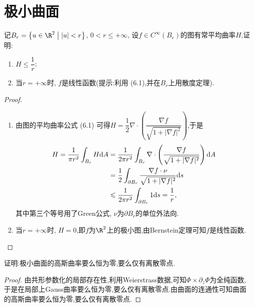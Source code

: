 \section{极小曲面}
\begin{excise}
		记$B_{r}=\left\{u\in\R^{2}\bigm||u|<r\right\}$, $0<r\leqslant +\infty$,
		设$f\in C^{\infty}(B_{r})$的图有常平均曲率$H$,证明:
		\begin{enumerate}[label=(\arabic*)]
			\item $H\leqslant\dfrac{1}{r}$;
			\item 当$r=+\infty$时, $f$是线性函数(提示:利用 (6.1),并在$B_{r}$上用散度定理).
		\end{enumerate}
	\end{excise}
	\begin{proof}
		\begin{enumerate}[label=(\arabic*)]
			\item 由图的平均曲率公式 (6.1) 可得$H=\dfrac{1}{2}\nabla\cdot\left(\dfrac{\nabla f}{\sqrt{1+|\nabla f|^{2}}}\right)$,于是
			\begin{align*}
				H=\frac{1}{\pi r^{2}}\int_{B_{r}}H\mathrm{d} A&=\frac{1}{2\pi r^{2}}\int_{B_{r}}\nabla\cdot\left(\dfrac{\nabla f}{\sqrt{1+|\nabla f|^{2}}}\right)\mathrm{d} A\\
				&=\frac{1}{2}\int_{\partial B_{r}}\dfrac{\nabla f\cdot\nu}{\sqrt{1+|\nabla f|^{2}}}\mathrm{d} s\\
				&\leqslant\frac{1}{2\pi r^{2}}\int_{\partial B_{r}}1 \mathrm{d} s=\frac{1}{r},
			\end{align*}
			其中第三个等号用了Green公式, $\nu$为$\partial B_{r}$的单位外法向.
			\item 当$r=+\infty$时, $H=0$,即$f$为$\R^{2}$上的极小图,由Bernstein定理可知$f$是线性函数.\qedhere
		\end{enumerate}
	\end{proof}
	\begin{excise}
		证明:极小曲面的高斯曲率要么恒为零,要么仅有离散零点.
	\end{excise}
	\begin{proof}
		由共形参数化的局部存在性,利用Weierstrass数据,可知$\Phi\times\partial_{z}\Phi$为全纯函数,于是在局部上Gauss曲率要么恒为零,要么仅有离散零点.由曲面的连通性可知曲面的高斯曲率要么恒为零,要么仅有离散零点.
	\end{proof}
